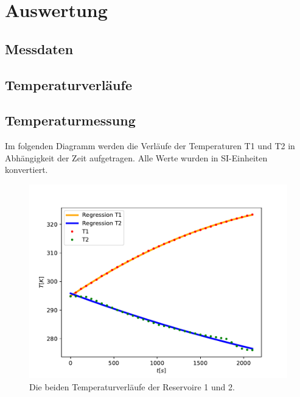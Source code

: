 \usepackage[
    locale=DE 
    separate-uncertainty=true 
    per-mode=symblo-or-fraction
]{siunitx}


\section{Auswertung}
\label{sec:Auswertung}

\subsection{Messdaten}


\subsection{Temperaturverläufe}
\subsection{Temperaturmessung}
Im folgenden Diagramm werden die Verläufe der Temperaturen T1 und T2 in Abhängigkeit der Zeit aufgetragen.
Alle Werte wurden in SI-Einheiten konvertiert.
\begin{figure}
  \centering
  \includegraphics[scale = 0.75]{Temperaturverlaeufe.pdf}
  \caption{Die beiden Temperaturverläufe der Reservoire 1 und 2.}
  \label{fig:TemperaturverlaufA}
\end{figure}

